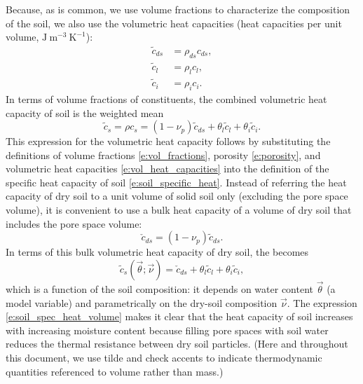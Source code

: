 \documentclass{report}
\begin{document}
Because, as is common, we use volume fractions to characterize the composition of the soil, we also use the volumetric heat capacities (heat capacities per unit volume, $\mathrm{J~m^{-3}~K^{-1}}$):
\begin{subequations}\label{e:vol_heat_capacities}
\begin{align}
    \tilde{c}_{ds} &= \rho_{ds} c_{ds},\\
    \tilde{c}_{l} &= \rho_{l} c_{l},\\
    \tilde{c}_{i} &= \rho_{i} c_{i}.
\end{align}
\end{subequations}
In terms of volume fractions of constituents, the combined volumetric heat capacity of soil is the weighted mean
\begin{equation}\label{e:soil_spec_heat_volume_0}
    \tilde c_s = \rho c_s = (1-\nu_p) \tilde c_{ds} + \theta_l \tilde c_l + \theta_i \tilde c_i.
\end{equation}
This expression for the volumetric heat capacity follows by substituting the definitions of volume fractions \eqref{e:vol_fractions}, porosity \eqref{e:porosity}, and volumetric heat capacities \eqref{e:vol_heat_capacities} into the definition of the specific heat capacity of soil \eqref{e:soil_specific_heat}. Instead of referring the heat capacity of dry soil to a unit volume of solid soil only (excluding the pore space volume), it is convenient to use a bulk heat capacity of a volume of dry soil that includes the pore space volume:
\begin{equation}\label{e:bulk_dry_heat_capacity0}
    \check{c}_{ds} = (1-\nu_p) \tilde{c}_{ds}.
\end{equation}
In terms of this bulk volumetric heat capacity of dry soil, the  becomes
\begin{equation}\label{e:soil_spec_heat_volume}
    \tilde c_s (\vec{\theta}; \vec{\nu}) = \check c_{ds} + \theta_l \tilde c_l + \theta_i \tilde c_i,
\end{equation}
which is a function of the soil composition: it depends on water content  $\vec{\theta}$ (a model variable) and parametrically on the dry-soil composition $\vec{\nu}$. The expression \eqref{e:soil_spec_heat_volume} makes it clear that the heat capacity of soil increases with increasing moisture content because filling pore spaces with soil water reduces the thermal resistance between dry soil particles. (Here and throughout this document, we use tilde and check accents to indicate thermodynamic quantities referenced to volume rather than mass.) 
\end{document}

